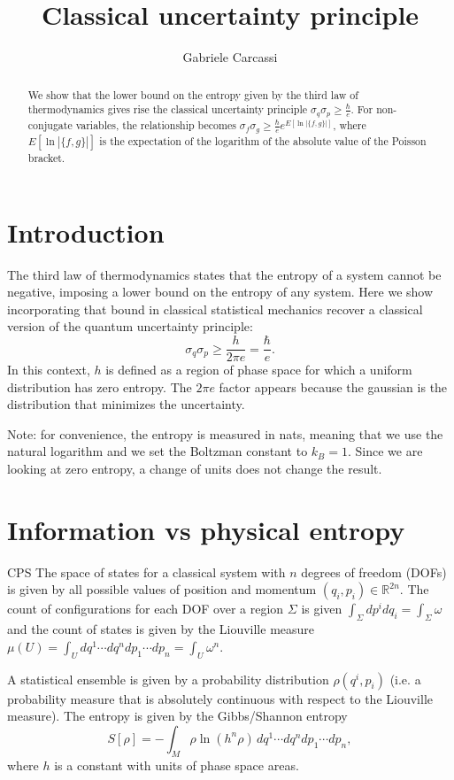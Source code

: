 \documentclass{techbrief}
\title{Classical uncertainty principle}
\author{Gabriele Carcassi}
\begin{document}
	
\maketitle
	
\begin{abstract}
	We show that the lower bound on the entropy given by the third law of thermodynamics gives rise the classical uncertainty principle $ \sigma_q \sigma_p \geq \frac{\hbar}{e}$. For non-conjugate variables, the relationship becomes $\sigma_f \sigma_g \geq \frac{\hbar}{e} e^{E[\ln |\{f,g\}|]}$, where $E[\ln |\{f,g\}|]$ is the expectation of the logarithm of the absolute value of the Poisson bracket.
\end{abstract}

\section{Introduction}

The third law of thermodynamics states that the entropy of a system cannot be negative, imposing a lower bound on the entropy of any system. Here we show incorporating that bound in classical statistical mechanics recover a classical version of the quantum uncertainty principle:
$$ \sigma_q \sigma_p \geq \frac{h}{2\pi e} = \frac{\hbar}{e}. $$
In this context, $h$ is defined as a region of phase space for which a uniform distribution has zero entropy. The $2\pi e$ factor appears because the gaussian is the distribution that minimizes the uncertainty.

Note: for convenience, the entropy is measured in nats, meaning that we use the natural logarithm and we set the Boltzman constant to $k_B=1$. Since we are looking at zero entropy, a change of units does not change the result.

\section{Information vs physical entropy}

\begin{condition}{CPS}
	The space of states for a classical system with $n$ degrees of freedom (DOFs) is given by all possible values of position and momentum $(q_i,p_i) \in \mathbb{R}^{2n}$. The count of configurations for each DOF over a region $\Sigma$ is given $\int_{\Sigma} dp^i dq_i = \int_{\Sigma} \omega$ and the count of states is given by the Liouville measure $\mu(U) = \int_U dq^1\cdots dq^n dp_1 \cdots dp_n = \int_U \omega^n$.
	
	A statistical ensemble is given by a probability distribution $\rho(q^i, p_i)$ (i.e. a probability measure that is absolutely continuous with respect to the Liouville measure). The entropy is given by the Gibbs/Shannon entropy
	$$ S[\rho] = - \int_M \rho \ln (h^n \rho) \, dq^1\cdots dq^n dp_1 \cdots dp_n,$$
	where $h$ is a constant with units of phase space areas.
\end{condition}
\end{document}
